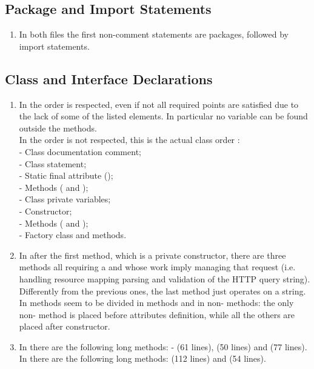 \subsection{Package and Import Statements}
\begin{enumerate}[NUM]
    \item In both files the first non-comment statements are packages, followed by import statements.
\end{enumerate}

\subsection{Class and Interface Declarations}
\begin{enumerate}[NUM]
    \item In  the order is respected, even if not all required points are satisfied due to the lack of some of the listed elements. In particular no variable can be found outside the methods.\\
    In  the order is not respected, this is the actual class order :\\
    - Class documentation comment;\\
    - Class statement;\\
    - Static final attribute ();\\
    - Methods ( and );\\
    - Class private variables;\\
    - Constructor;\\
    - Methods ( and );\\
    - Factory class and methods.
    
    \item In  after the first method, which is a private constructor, there are three methods all requiring a  and whose work imply managing that request (i.e. handling resource mapping parsing and validation of the HTTP query string). Differently from the previous ones, the last method just operates on a string.\\
    In  methods seem to be divided in  methods and in non- methods: the only non- method is placed before attributes definition, while all the others are placed after constructor.
    
    \item In  there are the following long methods: - (61 lines),  (50 lines) and  (77 lines).\\
    In  there are the following long methods:  (112 lines) and  (54 lines). 
\end{enumerate}

